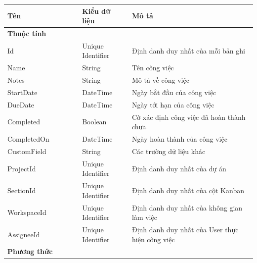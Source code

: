 \documentclass[../DoAn.tex]{subfiles}
\begin{document}
\begin{table}[H]
    \renewcommand{\arraystretch}{1.2}
    \centering{}
    \begin{tabular}{p{0.3\linewidth}p{0.2\linewidth}p{0.5\linewidth}}
        \hline
        \textbf{Tên}                  & \textbf{Kiểu dữ liệu} & \textbf{Mô tả}                                  \\ \hline
        \textbf{Thuộc tính}                                                                                     \\ \hline
        Id                            & Unique Identifier     & Định danh duy nhất của mỗi bản ghi              \\ \hline
        Name                          & String                & Tên công việc                                   \\ \hline
        Notes                         & String                & Mô tả về công việc                              \\ \hline
        StartDate                     & DateTime              & Ngày bắt đầu của công việc                      \\ \hline
        DueDate                       & DateTime              & Ngày tới hạn của công việc                      \\ \hline
        Completed                     & Boolean               & Cờ xác định công việc đã hoàn thành chưa        \\ \hline
        CompletedOn                   & DateTime              & Ngày hoàn thành của công việc                   \\ \hline
        CustomField                   & String                & Các trường dữ liệu khác                         \\ \hline
        ProjectId                     & Unique Identifier     & Định danh duy nhất của dự án                    \\ \hline
        SectionId                     & Unique Identifier     & Định danh duy nhất của cột Kanban               \\ \hline
        WorkspaceId                   & Unique Identifier     & Định danh duy nhất của không gian làm việc      \\ \hline
        AssigneeId                    & Unique Identifier     & Định danh duy nhất của User thực hiện công việc \\ \hline
        \textbf{Phương thức}                                                                                    \\ \hline

\end{tabular}
\end{table}
\end{document}
